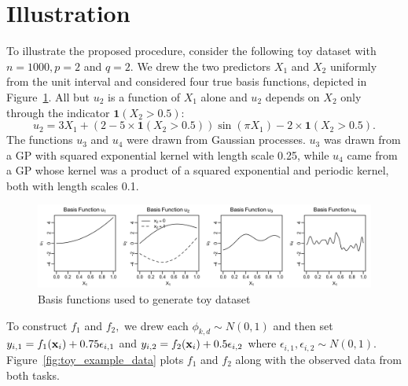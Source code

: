 \documentclass[12pt]{article}
\begin{document}
\newpage
\section{Illustration}

To illustrate the proposed procedure, consider the following toy dataset with $n = 1000, p = 2$ and $q = 2.$
We drew the two predictors $X_{1}$ and $X_{2}$ uniformly from the unit interval and considered four true basis functions, depicted in Figure~\ref{fig:toy_example_basis}.
All but $u_{2}$ is a function of $X_{1}$ alone and $u_{2}$ depends on $X_{2}$ only through the indicator $\mathbf{1}(X_{2} > 0.5)$:
$$
u_{2} = 3X_{1} + (2 - 5\times\mathbf{1}(X_{2} > 0.5))\sin\left(\pi X_{1}\right) - 2\times \mathbf{1}(X_{2} > 0.5).
$$
The functions $u_{3}$ and $u_{4}$ were drawn from Gaussian processes.
$u_{3}$ was drawn from a GP with squared exponential kernel with length scale 0.25, while $u_{4}$ came from a GP whose kernel was a product of a squared exponential and periodic kernel, both with length scales 0.1.

\begin{figure}[H]
\centering
\includegraphics[width = \textwidth]{../images/toy_example_basis.png}
\caption{Basis functions used to generate toy dataset}
\label{fig:toy_example_basis}
\end{figure}

To construct $f_{1}$ and $f_{2},$ we drew each $\phi_{k,d} \sim N(0,1)$ and then set $y_{i,1} = f_{1}(\mathbf{x}_{i}) + 0.75\epsilon_{i,1}$ and $y_{i,2} = f_{2}(\mathbf{x}_{i}) + 0.5\epsilon_{i,2}$ where $\epsilon_{i,1}, \epsilon_{i,2} \sim N(0,1).$
Figure~\ref{fig:toy_example_data} plots $f_{1}$ and $f_{2}$ along with the observed data from both tasks.
\end{document}
